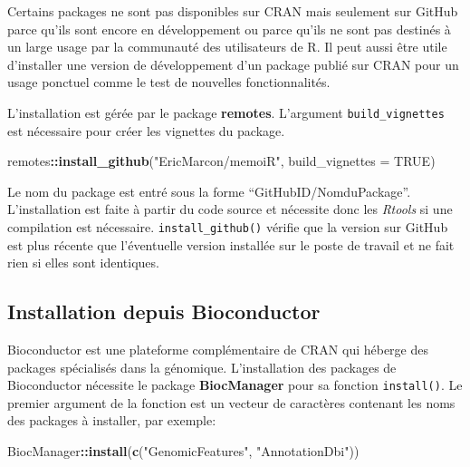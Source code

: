 \documentclass[
  12pt,
  french,
  a4paper,
  extrafontsizes,onecolumn,openright
  ]{memoir}
\newenvironment{Shaded}{\begin{snugshade}}{\end{snugshade}}
\newcommand{\AttributeTok}[1]{\textcolor[rgb]{0.13,0.29,0.53}{#1}}
\newcommand{\ConstantTok}[1]{\textcolor[rgb]{0.56,0.35,0.01}{#1}}
\newcommand{\FunctionTok}[1]{\textcolor[rgb]{0.13,0.29,0.53}{\textbf{#1}}}
\newcommand{\NormalTok}[1]{#1}
\newcommand{\SpecialCharTok}[1]{\textcolor[rgb]{0.81,0.36,0.00}{\textbf{#1}}}
\newcommand{\StringTok}[1]{\textcolor[rgb]{0.31,0.60,0.02}{#1}}
\begin{document}
Certains packages ne sont pas disponibles sur CRAN mais seulement sur GitHub parce qu'ils sont encore en développement ou parce qu'ils ne sont pas destinés à un large usage par la communauté des utilisateurs de R.
Il peut aussi être utile d'installer une version de développement d'un package publié sur CRAN pour un usage ponctuel comme le test de nouvelles fonctionnalités.

L'installation est gérée par le package \textbf{remotes}.
L'argument \texttt{build\_vignettes} est nécessaire pour créer les vignettes du package.

\scriptsize

\begin{Shaded}
\begin{Highlighting}[]
\NormalTok{remotes}\SpecialCharTok{::}\FunctionTok{install\_github}\NormalTok{(}\StringTok{"EricMarcon/memoiR"}\NormalTok{, }\AttributeTok{build\_vignettes =} \ConstantTok{TRUE}\NormalTok{)}
\end{Highlighting}
\end{Shaded}

\normalsize

Le nom du package est entré sous la forme \enquote{GitHubID/NomduPackage}.
L'installation est faite à partir du code source et nécessite donc les \emph{Rtools} si une compilation est nécessaire.
\texttt{install\_github()} vérifie que la version sur GitHub est plus récente que l'éventuelle version installée sur le poste de travail et ne fait rien si elles sont identiques.

\subsection{Installation depuis Bioconductor}\label{installation-depuis-bioconductor}

Bioconductor est une plateforme complémentaire de CRAN qui héberge des packages spécialisés dans la génomique.
L'installation des packages de Bioconductor nécessite le package \textbf{BiocManager} pour sa fonction \texttt{install()}.
Le premier argument de la fonction est un vecteur de caractères contenant les noms des packages à installer, par exemple:

\scriptsize

\begin{Shaded}
\begin{Highlighting}[]
\NormalTok{BiocManager}\SpecialCharTok{::}\FunctionTok{install}\NormalTok{(}\FunctionTok{c}\NormalTok{(}\StringTok{"GenomicFeatures"}\NormalTok{, }\StringTok{"AnnotationDbi"}\NormalTok{))}
\end{Highlighting}
\end{Shaded}
\end{document}
